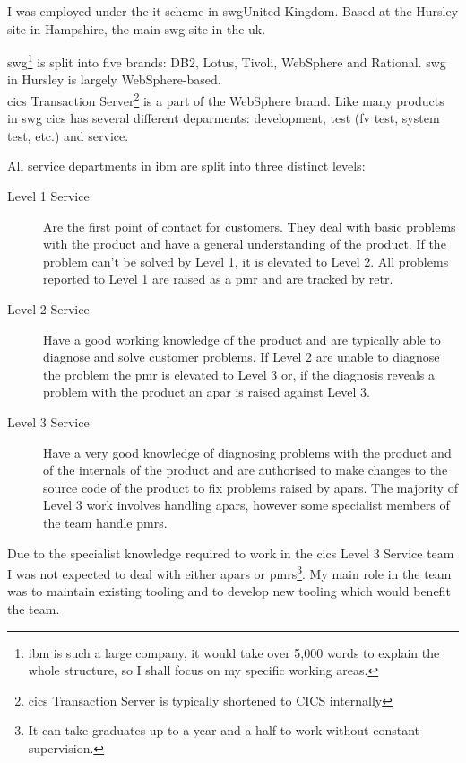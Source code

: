 \documentclass[a4paper,11pt]{report}
\begin{document}
I was employed under the \gls{it} scheme in \gls{swg}{United Kingdom}. Based at the Hursley site in 
Hampshire, the main \gls{swg} site in the \gls{uk}.

\Gls{swg}\footnote{\gls{ibm} is such a large company, it would take over 5,000 words to explain the
whole structure, so I shall focus on my specific working areas.} is split into five brands: DB2, 
Lotus, Tivoli, WebSphere and Rational. \Gls{swg} in Hursley is largely WebSphere-based. \\



\Gls{cics} Transaction Server\footnote{\Gls{cics} Transaction Server is typically shortened to CICS
internally} is a part of the WebSphere brand. Like many products in \gls{swg} \gls{cics} has 
several different deparments: development, test (\gls{fv} test, system test, etc.) and service.

All service departments in \gls{ibm} are split into three distinct levels:

\begin{description}
\item[Level 1 Service] Are the first point of contact for customers. They deal with basic problems
with the product and have a general understanding of the product. If the problem can't be solved by
Level 1, it is elevated to Level 2. All problems reported to Level 1 are raised as a \gls{pmr} and
are tracked by \gls{retr}.
\item[Level 2 Service] Have a good working knowledge of the product and are typically able to 
diagnose and solve customer problems. If Level 2 are unable to diagnose the problem the \gls{pmr}
is elevated to Level 3 or, if the diagnosis reveals a problem with the product an \gls{apar} is
raised against Level 3. 
\item[Level 3 Service] Have a very good knowledge of diagnosing problems with the product and of
the internals of the product and are authorised to make changes to the source code of the product
to fix problems raised by \gls{apar}s. The majority of Level 3 work involves handling \gls{apar}s,
however some specialist members of the team handle \gls{pmr}s.
\end{description}

Due to the specialist knowledge required to work in the \gls{cics} Level 3 Service team I was not
expected to deal with either \gls{apar}s or \gls{pmr}s\footnote{It can take graduates up to a year
and a half to work without constant supervision.}. My main role in the team was to maintain 
existing tooling and to develop new tooling which would benefit the team. \\
\end{document}
